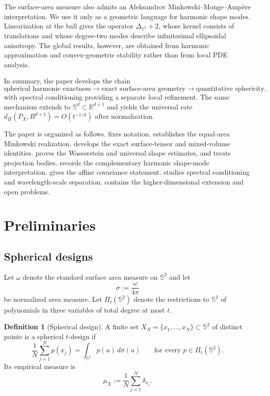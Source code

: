 \documentclass[11pt]{article}
\theoremstyle{definition}
\newtheorem{definition}[theorem]{Definition}
\theoremstyle{remark}
\newcommand{\Sph}{\mathbb S}
\newcommand{\R}{\mathbb R}
\begin{document}
The surface-area measure also admits an Aleksandrov Minkowski--Monge--Amp\`ere interpretation. We use it only as a geometric language for harmonic shape modes. Linearization at the ball gives the operator $\Delta_{\Sph^2}+2$, whose kernel consists of translations and whose degree-two modes describe infinitesimal ellipsoidal anisotropy. The global results, however, are obtained from harmonic approximation and convex-geometric stability rather than from local PDE analysis.

In summary, the paper develops the chain
\[
\text{spherical harmonic exactness}
\longrightarrow
\text{exact surface-area geometry}
\longrightarrow
\text{quantitative sphericity},
\]
with spectral conditioning providing a separate local refinement. The same mechanism extends to $\Sph^d\subset\R^{d+1}$ and yields the universal rate $d_H(P_X,B^{d+1})=O(t^{-1/d})$ after normalization.

The paper is organized as follows.  fixes notation.  establishes the equal-area Minkowski realization.  develops the exact surface-tensor and mixed-volume identities.  proves the Wasserstein and universal shape estimates, and  treats projection bodies.  records the complementary harmonic shape-mode interpretation.  gives the affine covariance statement.  studies spectral conditioning and wavelength-scale separation.  contains the higher-dimensional extension and open problems.

\section{Preliminaries}\label{sec:prelim}

\subsection{Spherical designs}
Let $\omega$ denote the standard surface area measure on $\Sph^2$ and let
\[
\sigma:=\frac{\omega}{4\pi}
\]
be normalized area measure. Let $\Pi_t(\Sph^2)$ denote the restrictions to $\Sph^2$ of polynomials in three variables of total degree at most $t$.

\begin{definition}[Spherical design]\label{def:design}
A finite set $X_N=\{x_1,\dots,x_N\}\subset\Sph^2$ of distinct points is a spherical $t$-design if
\begin{equation}\label{eq:design}
\frac1N\sum_{j=1}^N p(x_j)=\int_{\Sph^2}p(u)\,d\sigma(u)
\qquad\text{for every }p\in\Pi_t(\Sph^2).
\end{equation}
Its empirical measure is
\[
\mu_X:=\frac1N\sum_{j=1}^N\delta_{x_j}.
\]
\end{definition}
\end{document}
